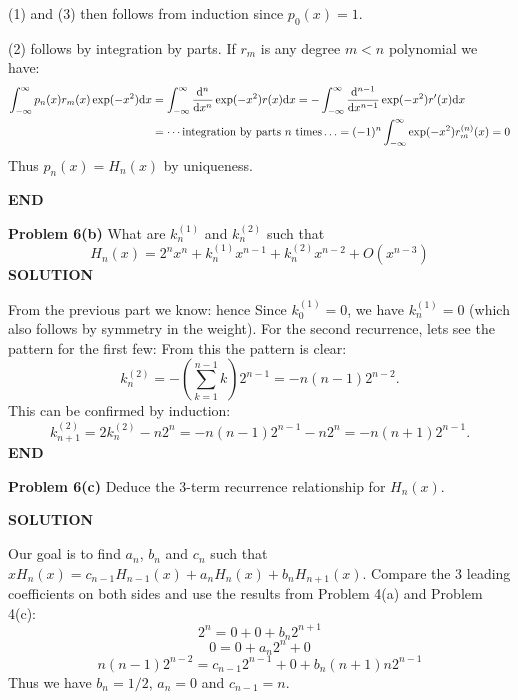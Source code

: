 \documentclass[12pt,a4paper]{article}
\begin{document}
(1) and (3) then follows from induction since $p_0(x)=1$.

(2) follows by integration by parts. If $r_m$ is any degree $m<n$ polynomial we have:
\begin{align*}
\int_{-\ensuremath{\infty}}^\ensuremath{\infty} p_n(x)r_m(x)\exp(-x^2){\rm d}x&=\int_{-\ensuremath{\infty}}^\ensuremath{\infty}{{\rm d}^n \over {\rm d}x^n} \exp(-x^2)r(x){\rm d}x = -\int_{-\ensuremath{\infty}}^\ensuremath{\infty}{{\rm d}^{n-1} \over {\rm d}x^{n-1}} \exp(-x^2)r'(x){\rm d}x\\
&=\ensuremath{\cdots}\text{integration by parts $n$ times}\ensuremath{\ldots}=(-1)^n\int_{-\ensuremath{\infty}}^\ensuremath{\infty} \exp(-x^2)r_m^{(n)}(x)=0
\end{align*}
Thus $p_n(x) = H_n(x)$ by uniqueness.

\textbf{END}

\textbf{Problem 6(b)} What are $k_n^{(1)}$ and $k_n^{(2)}$ such that
\[
H_n(x) = 2^n x^n + k_n^{(1)} x^{n-1} + k_n^{(2)} x^{n-2} + O(x^{n-3})
\]
\textbf{SOLUTION}

From the previous part we know:
hence
Since $k_0^{(1)}=0$, we have $k_n^{(1)}=0$ (which also follows by symmetry in the weight). For the second recurrence, lets see the pattern for the first few:
From this the pattern is clear:
\[
k_n^{(2)} = -(\ensuremath{\sum}_{k=1}^{n-1} k) 2^{n-1} = -n(n-1)2^{n-2}.
\]
This can be confirmed by induction:
\[
k_{n+1}^{(2)}=2k_n^{(2)}-n2^n = -n(n-1)2^{n-1} - n2^n = -n(n+1)2^{n-1}.
\]
\textbf{END}

\textbf{Problem 6(c)} Deduce the 3-term recurrence relationship for $H_n(x)$.

\textbf{SOLUTION}

Our goal is to find $a_n$, $b_n$ and $c_n$ such that $xH_n(x)=c_{n-1}H_{n-1}(x)+a_nH_n(x)+b_nH_{n+1}(x).$ Compare the 3 leading coefficients on both sides and use the results from Problem 4(a) and Problem 4(c):
\[
2^n=0+0+b_n2^{n+1}
\]
\[
0=0+a_n2^n+0
\]
\[
n(n-1)2^{n-2}=c_{n-1}2^{n-1}+0+b_n(n+1)n2^{n-1}
\]
Thus we have $b_n=1/2$, $a_n=0$ and $c_{n-1}=n$.
\end{document}
